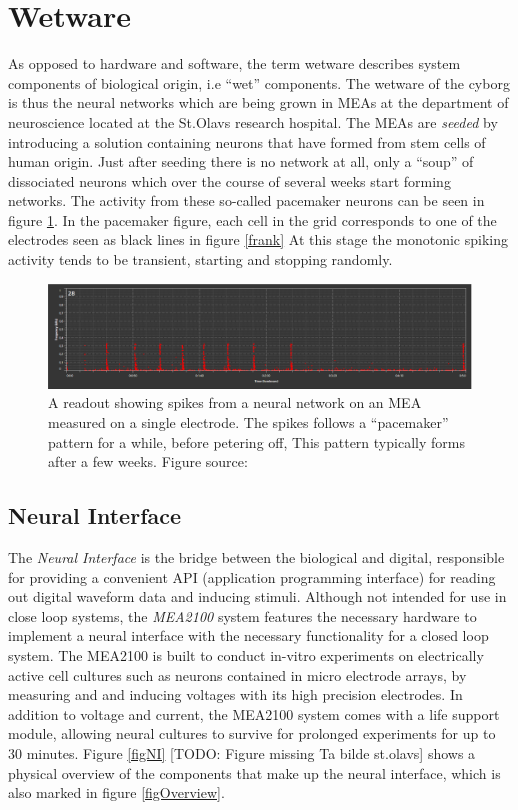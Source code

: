 \section{Wetware}
As opposed to hardware and software, the term wetware describes system
components of biological origin, i.e ``wet'' components.
The wetware of the cyborg is thus the neural networks which are being grown in
MEAs at the department of neuroscience located at the St.Olavs research hospital.
The MEAs are \emph{seeded} by introducing a solution containing neurons that
have formed from stem cells of human origin\cite{TMAC}.
Just after seeding there is no network at all, only a ``soup'' of dissociated
neurons which over the course of several weeks start forming networks.
The activity from these so-called pacemaker neurons can be seen in figure
\ref{pacemaker}.
In the pacemaker figure, each cell in the grid corresponds to one of the
electrodes seen as black lines in figure \ref{frank}
At this stage the monotonic spiking activity tends to be transient, starting and
stopping randomly.
\begin{figure}[h]
  \centering
  \includegraphics[width=1\textwidth]{fig/tonic.png}
  \caption{
    A readout showing spikes from a neural network on an MEA measured on a
    single electrode.
    The spikes follows a ``pacemaker'' pattern for a while, before petering off,
    This pattern typically forms after a few weeks.
    Figure source: \cite{TMAC}
  }
  \label{pacemaker}
\end{figure}
\subsection{Neural Interface}
The \emph{Neural Interface} is the bridge between the biological and digital,
responsible for providing a convenient API (application programming interface)
for reading out digital waveform data and inducing stimuli.
Although not intended for use in close loop systems, the \textit{MEA2100}
system features the necessary hardware to implement a neural interface with the
necessary functionality for a closed loop system.
The MEA2100 is built to conduct in-vitro experiments on electrically active cell
cultures such as neurons contained in micro electrode arrays, by measuring and
and inducing voltages with its high precision electrodes.
In addition to voltage and current, the MEA2100 system comes with a life support
module, allowing neural cultures to survive for prolonged experiments for up to
30 minutes.
Figure \ref{figNI} [TODO: Figure missing Ta bilde st.olavs] shows a physical overview of the components that make up the
neural interface, which is also marked in figure \ref{figOverview}.
